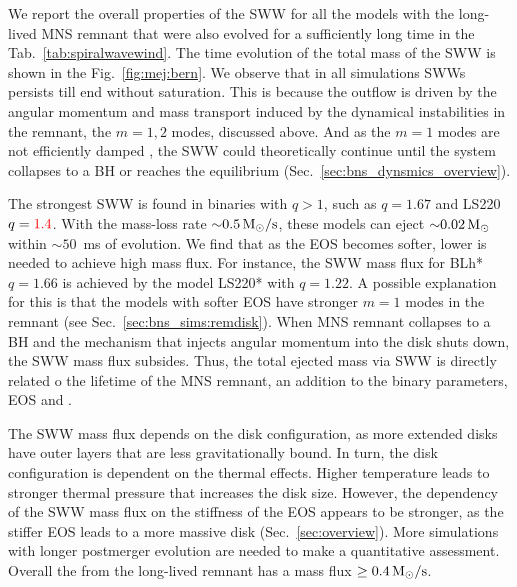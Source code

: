 We report the overall properties of the \ac{SWW} for all the models with the 
long-lived \ac{MNS} remnant that were also evolved for a sufficiently long time 
in the Tab.~\ref{tab:spiralwavewind}. 
The time evolution of the total mass of the \ac{SWW} is shown in the Fig.~\ref{fig:mej:bern}.
We observe that in all simulations \acp{SWW} persists till end without saturation.
This is because the outflow is driven by the angular momentum and mass transport 
induced by the dynamical instabilities in the remnant, the $m=1,2$ modes, discussed 
above. And as the $m=1$ modes are not efficiently damped \citep{Paschalidis:2015mla,Radice:2016gym,Lehner:2016wjg,East:2016zvv},
the \ac{SWW} could theoretically continue until the system collapses to a \ac{BH} 
or reaches the equilibrium (Sec.~\ref{sec:bns_dynsmics_overview}).

The strongest \ac{SWW} is found in binaries with $q>1$, such as 
$q=1.67$ and LS220 $q=\textcolor{red}{1.4}$. 
With the mass-loss rate ${\sim}0.5\, {\text{M}_{\odot}}/{\text{s}}$, these models can eject 
${\sim}0.02\,{\text{M}_{\odot}}$ within ${\sim}50$~ms of \pmerg{} evolution.
We find that as the \ac{EOS} becomes softer, lower \mr{} is needed to achieve high 
mass flux. For instance, the \ac{SWW} mass flux for BLh* $q=1.66$ is achieved by the 
model LS220* with $q=1.22$. 
A possible explanation for this is that the models with softer \ac{EOS} have stronger 
$m=1$ modes in the remnant (see Sec.~\ref{sec:bns_sims:remdisk}).
When \ac{MNS} remnant collapses to a \ac{BH} and the mechanism that injects angular 
momentum into the disk shuts down, the \ac{SWW} mass flux subsides. 
Thus, the total ejected mass via \ac{SWW} is directly related  o the lifetime of the 
\ac{MNS} remnant, an addition to the binary parameters, \ac{EOS} and \mr{}.

The \ac{SWW} mass flux depends on the disk configuration, as more extended disks 
have outer layers that are less gravitationally bound. In turn, the disk 
configuration is dependent on the thermal effects. Higher temperature leads to 
stronger thermal pressure that increases the disk size. 
However, the dependency of the \ac{SWW} mass flux on the stiffness of the \ac{EOS} 
appears to be stronger, as the stiffer \ac{EOS} leads to a more massive disk 
(Sec.~\ref{sec:overview}). More simulations with longer postmerger evolution are needed 
to make a quantitative assessment. 
Overall the \swind{} from the long-lived remnant has a mass flux $\geq 0.4\, {\text{M}_{\odot}}/{\text{s}}$.

